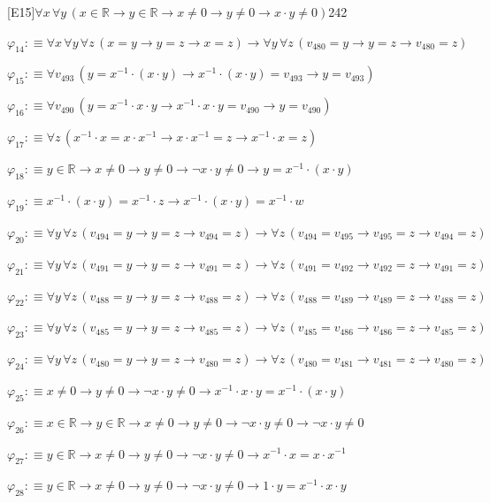 \begin{fullproof}{[E15]}{$\forall x\,\forall y\,(x \in \mathbb{R} \to y \in \mathbb{R} \to x \neq 0 \to y \neq 0 \to x \cdot y \neq 0)$}{242}
\begin{abbrevlist}
\item $\varphi_{14} :\equiv \forall x\,\forall y\,\forall z\,(x = y \to y = z \to x = z) \to \forall y\,\forall z\,(v_{480} = y \to y = z \to v_{480} = z)$
\item $\varphi_{15} :\equiv \forall v_{493}\,(y = x^{-1} \cdot (x \cdot y) \to x^{-1} \cdot (x \cdot y) = v_{493} \to y = v_{493})$
\item $\varphi_{16} :\equiv \forall v_{490}\,(y = x^{-1} \cdot x \cdot y \to x^{-1} \cdot x \cdot y = v_{490} \to y = v_{490})$
\item $\varphi_{17} :\equiv \forall z\,(x^{-1} \cdot x = x \cdot x^{-1} \to x \cdot x^{-1} = z \to x^{-1} \cdot x = z)$
\item $\varphi_{18} :\equiv y \in \mathbb{R} \to x \neq 0 \to y \neq 0 \to \neg x \cdot y \neq 0 \to y = x^{-1} \cdot (x \cdot y)$
\item $\varphi_{19} :\equiv x^{-1} \cdot (x \cdot y) = x^{-1} \cdot z \to x^{-1} \cdot (x \cdot y) = x^{-1} \cdot w$
\item $\varphi_{20} :\equiv \forall y\,\forall z\,(v_{494} = y \to y = z \to v_{494} = z) \to \forall z\,(v_{494} = v_{495} \to v_{495} = z \to v_{494} = z)$
\item $\varphi_{21} :\equiv \forall y\,\forall z\,(v_{491} = y \to y = z \to v_{491} = z) \to \forall z\,(v_{491} = v_{492} \to v_{492} = z \to v_{491} = z)$
\item $\varphi_{22} :\equiv \forall y\,\forall z\,(v_{488} = y \to y = z \to v_{488} = z) \to \forall z\,(v_{488} = v_{489} \to v_{489} = z \to v_{488} = z)$
\item $\varphi_{23} :\equiv \forall y\,\forall z\,(v_{485} = y \to y = z \to v_{485} = z) \to \forall z\,(v_{485} = v_{486} \to v_{486} = z \to v_{485} = z)$
\item $\varphi_{24} :\equiv \forall y\,\forall z\,(v_{480} = y \to y = z \to v_{480} = z) \to \forall z\,(v_{480} = v_{481} \to v_{481} = z \to v_{480} = z)$
\item $\varphi_{25} :\equiv x \neq 0 \to y \neq 0 \to \neg x \cdot y \neq 0 \to x^{-1} \cdot x \cdot y = x^{-1} \cdot (x \cdot y)$
\item $\varphi_{26} :\equiv x \in \mathbb{R} \to y \in \mathbb{R} \to x \neq 0 \to y \neq 0 \to \neg x \cdot y \neq 0 \to \neg x \cdot y \neq 0$
\item $\varphi_{27} :\equiv y \in \mathbb{R} \to x \neq 0 \to y \neq 0 \to \neg x \cdot y \neq 0 \to x^{-1} \cdot x = x \cdot x^{-1}$
\item $\varphi_{28} :\equiv y \in \mathbb{R} \to x \neq 0 \to y \neq 0 \to \neg x \cdot y \neq 0 \to 1 \cdot y = x^{-1} \cdot x \cdot y$

\end{abbrevlist}
\end{fullproof}
